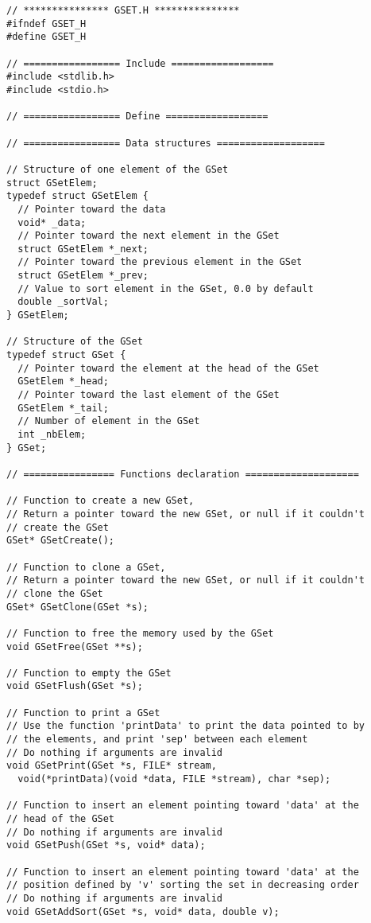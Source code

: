 \documentclass[12pt, a4paper]{article}
\begin{document}
\begin{scriptsize}
\begin{ttfamily}
\begin{lstlisting}
// *************** GSET.H ***************
#ifndef GSET_H
#define GSET_H

// ================= Include ==================
#include <stdlib.h>
#include <stdio.h>

// ================= Define ==================

// ================= Data structures ===================

// Structure of one element of the GSet
struct GSetElem;
typedef struct GSetElem {
  // Pointer toward the data
  void* _data;
  // Pointer toward the next element in the GSet
  struct GSetElem *_next;
  // Pointer toward the previous element in the GSet
  struct GSetElem *_prev;
  // Value to sort element in the GSet, 0.0 by default
  double _sortVal;
} GSetElem;

// Structure of the GSet
typedef struct GSet {
  // Pointer toward the element at the head of the GSet
  GSetElem *_head;
  // Pointer toward the last element of the GSet
  GSetElem *_tail;
  // Number of element in the GSet
  int _nbElem;
} GSet;

// ================ Functions declaration ====================

// Function to create a new GSet,
// Return a pointer toward the new GSet, or null if it couldn't
// create the GSet
GSet* GSetCreate();

// Function to clone a GSet,
// Return a pointer toward the new GSet, or null if it couldn't
// clone the GSet
GSet* GSetClone(GSet *s);

// Function to free the memory used by the GSet
void GSetFree(GSet **s);

// Function to empty the GSet
void GSetFlush(GSet *s);

// Function to print a GSet
// Use the function 'printData' to print the data pointed to by 
// the elements, and print 'sep' between each element
// Do nothing if arguments are invalid
void GSetPrint(GSet *s, FILE* stream, 
  void(*printData)(void *data, FILE *stream), char *sep);

// Function to insert an element pointing toward 'data' at the 
// head of the GSet
// Do nothing if arguments are invalid
void GSetPush(GSet *s, void* data);

// Function to insert an element pointing toward 'data' at the 
// position defined by 'v' sorting the set in decreasing order
// Do nothing if arguments are invalid
void GSetAddSort(GSet *s, void* data, double v);


\end{lstlisting}
\end{ttfamily}
\end{scriptsize}
\end{document}
